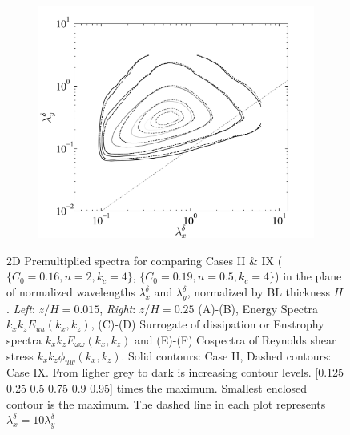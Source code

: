 \begin{figure}
\begin{subfigure}[t]{0.5\textwidth}
                \label{fig:energy3b}
        \end{subfigure}%
        \centering
        \begin{subfigure}[t]{0.5\textwidth}
                \includegraphics[width=\linewidth]{Fig3/cospectra_contour_ABL_n2n05_level5.pdf}
                \caption{}
                \label{fig:dissip3b}
        \end{subfigure}              
        
        \caption[Premultiplied Spectra 2]{2D Premultiplied spectra for comparing Cases II \& IX ($\lbrace C_0 = 0.16, n = 2, k_c = 4\rbrace$, $\lbrace C_0 = 0.19, n = 0.5, k_c = 4\rbrace$) in the plane of normalized wavelengths $\lambda_x^{\delta}$ and $\lambda_y^{\delta}$, normalized by BL thickness $H$. \textit{Left}: $z/H = 0.015$, \textit{Right}: $z/H = 0.25$ (A)-(B), Energy Spectra $k_xk_zE_{uu}(k_x,k_z)$, (C)-(D) Surrogate of dissipation or Enstrophy spectra $k_xk_zE_{\omega\omega}(k_x,k_z)$ and (E)-(F) Cospectra of Reynolds shear stress $k_xk_z\phi_{uw}(k_x,k_z)$. Solid contours: Case II, Dashed contours: Case IX. From ligher grey to dark is increasing contour levels. [0.125 0.25 0.5 0.75 0.9 0.95] times the maximum. Smallest enclosed contour is the maximum. The dashed line in each plot represents $\lambda_x^{\delta} = 10 \lambda_y^{\delta}$} \label{fig:2d_spec_diss2}
\end{figure}

